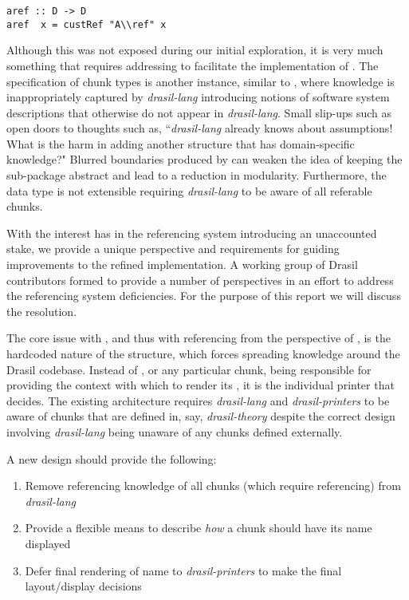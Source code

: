 \begin{tcolorbox}
\begin{verbatim}
aref :: D -> D
aref  x = custRef "A\\ref" x 
\end{verbatim}
\end{tcolorbox}

Although this was not exposed during our initial exploration, it is very much something that requires addressing to facilitate the implementation of . The specification of chunk types is another instance, similar to , where knowledge is inappropriately captured by \textit{drasil-lang} introducing notions of software system descriptions that otherwise do not appear in \textit{drasil-lang}. Small slip-ups such as  open doors to thoughts such as, ``\textit{drasil-lang} already knows about assumptions! What is the harm in adding another structure that has domain-specific knowledge?" Blurred boundaries produced by  can weaken the idea of keeping the sub-package abstract and lead to a reduction in modularity. Furthermore, the  data type is not extensible requiring \textit{drasil-lang} to be aware of all referable chunks.

With the interest  has in the referencing system introducing an unaccounted stake, we provide a unique perspective and requirements for guiding improvements to the refined implementation. A working group of Drasil contributors formed to provide a number of perspectives in an effort to address the referencing system deficiencies. For the purpose of this report we will discuss the  resolution.

The core issue with , and thus with referencing from the perspective of , is the hardcoded nature of the structure, which forces spreading knowledge around the Drasil codebase. Instead of , or any particular chunk, being responsible for providing the context with which to render its , it is the individual printer that decides. The existing architecture requires \textit{drasil-lang} and \textit{drasil-printers} to be aware of chunks that are defined in, say, \textit{drasil-theory} despite the correct design involving \textit{drasil-lang} being unaware of any chunks defined externally. 

A new design should provide the following: 
\begin{enumerate}
	\item Remove referencing knowledge of all chunks (which require referencing) from \textit{drasil-lang}
	\item Provide a flexible means to describe \textit{how} a chunk should have its name displayed
	\item Defer final rendering of name to \textit{drasil-printers} to make the final layout/display decisions
\end{enumerate}

